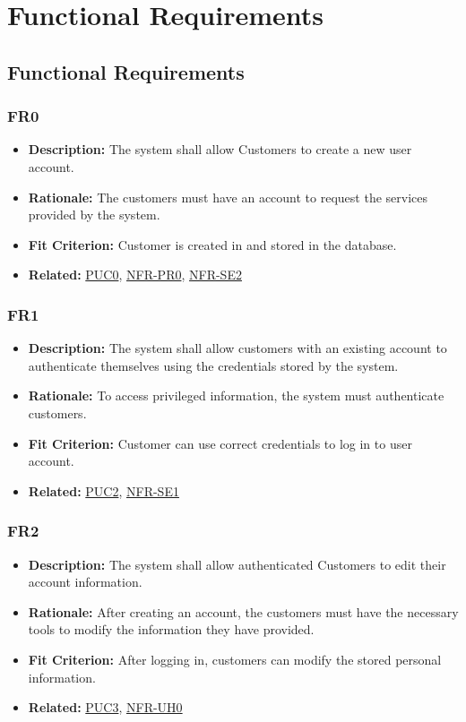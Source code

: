 \documentclass[12pt]{article}
\begin{document}
\newpage
\section{Functional Requirements}
\subsection{Functional Requirements}
\subsubsection*{FR0}
\label{sec:FR0}
\begin{itemize}
  \item \textbf{Description:} The system shall allow Customers to create a new user account.
  \item \textbf{Rationale:} The customers must have an account to request the services provided by the system.
  \item \textbf{Fit Criterion:} Customer is created in and stored in the database.
  \item \textbf{Related:} \hyperref[sec:PUC0]{PUC0}, \hyperref[sec:PR0]{NFR-PR0}, \hyperref[sec:SE2]{NFR-SE2}
\end{itemize}
\subsubsection*{FR1}
\label{sec:FR1}
\begin{itemize}
  \item \textbf{Description:} The system shall allow customers with an existing account to authenticate themselves using the credentials stored by the system.
  \item \textbf{Rationale:} To access privileged information, the system must authenticate customers.
  \item \textbf{Fit Criterion:} Customer can use correct credentials to log in to user account.
  \item \textbf{Related:} \hyperref[sec:PUC2]{PUC2}, \hyperref[sec:SE1]{NFR-SE1}
\end{itemize}
\subsubsection*{FR2}
\label{sec:FR2}
\begin{itemize}
  \item \textbf{Description:} The system shall allow authenticated Customers to edit their account information.
  \item \textbf{Rationale:} After creating an account, the customers must have the necessary tools to modify the information they have provided.
  \item \textbf{Fit Criterion:} After logging in, customers can modify the stored personal information.
  \item \textbf{Related:} \hyperref[sec:PUC3]{PUC3}, \hyperref[sec:UH0]{NFR-UH0}
\end{itemize}
\end{document}
